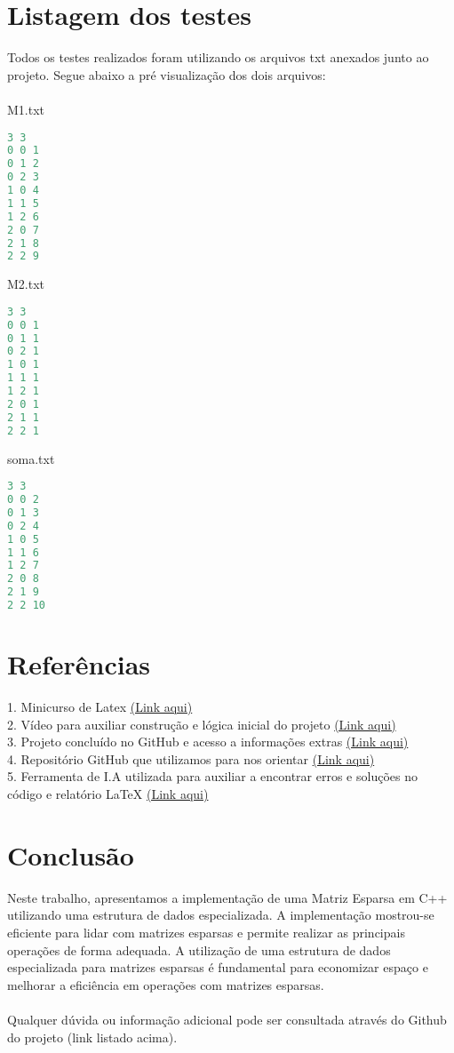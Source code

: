 \documentclass[a4paper,12pt]{article}
\begin{document}
\section{Listagem dos testes}
Todos os testes realizados foram utilizando os arquivos txt anexados junto ao projeto. Segue abaixo a pré visualização dos dois arquivos:
\\\\
M1.txt
\begin{lstlisting}[language=C++]
3 3
0 0 1
0 1 2
0 2 3
1 0 4
1 1 5
1 2 6
2 0 7
2 1 8
2 2 9
\end{lstlisting}
M2.txt
\begin{lstlisting}[language=C++]
3 3
0 0 1
0 1 1
0 2 1
1 0 1
1 1 1
1 2 1
2 0 1
2 1 1
2 2 1
\end{lstlisting}
soma.txt
\begin{lstlisting}[language=C++]
3 3
0 0 2
0 1 3
0 2 4
1 0 5
1 1 6
1 2 7
2 0 8
2 1 9
2 2 10
\end{lstlisting}
\section{Referências}\label{sec:ref}
1. Minicurso de Latex \href{https://www.youtube.com/playlist?list=PLjbaYg8NJsoNZY87IDxKzZ6x2XeXtICim}{(Link aqui)}
\\2. Vídeo para auxiliar construção e lógica inicial do projeto \href{https://www.youtube.com/watch?v=tMoJYQ3pkUw&t}{(Link aqui)}
\\3. Projeto concluído no GitHub e acesso a informações extras \href{https://www.youtube.com/watch?v=tMoJYQ3pkUw&t}{(Link aqui)}
\\4. Repositório GitHub que utilizamos para nos orientar \href{https://github.com/ArthurAssuncao/Matriz_Esparsa}{(Link aqui)}
\\5. Ferramenta de I.A utilizada para auxiliar a encontrar erros e soluções no código e relatório LaTeX \href{https://chat.openai.com/}{(Link aqui)}
\section{Conclusão}
Neste trabalho, apresentamos a implementação de uma Matriz Esparsa em C++ utilizando uma estrutura de dados especializada. A implementação mostrou-se eficiente para lidar com matrizes esparsas e permite realizar as principais operações de forma adequada. A utilização de uma estrutura de dados especializada para matrizes esparsas é fundamental para economizar espaço e melhorar a eficiência em operações com matrizes esparsas.
\\\\
Qualquer dúvida ou informação adicional pode ser consultada através do Github do projeto (link listado acima).
\end{document}
